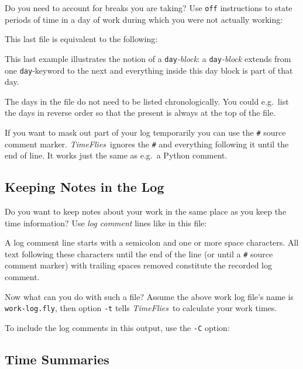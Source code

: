 \documentclass[11pt]{article}
\newcommand{\timeflies}{\emph{TimeFlies}}
\begin{document}
Do you need to account for breaks you are taking? Use \verb-off- instructions to state periods of time in a day of work during which you were not actually working:



This last file is equivalent to the following:



This last example illustrates the notion of a \verb-day-\emph{-block}: a \verb-day-\emph{-block} extends
from one \verb-day--keyword to the next and everything inside this day block is part of that day.

The days in the file do not need to be listed chronologically. You could e.g.\ list the days in reverse order so that the present is always at the top of the file.

If you want to mask out part of your log temporarily you can use the \verb-#- source comment marker. \timeflies\ ignores the \verb-#- and everything following it until the end of line. It works just the same as e.g.\ a Python comment.



\subsection{Keeping Notes in the Log}

Do you want to keep notes about your work in the same place as you keep the time information? Use \emph{log comment} lines like in this file:



A log comment line starts with a semicolon and one or more space characters. All text following these characters until the end of the line (or until a \verb-#- source comment marker) with trailing spaces removed constitute the recorded log comment.

Now what can you do with such a file? Assume the above work log file's name is \verb:work-log.fly:, then option \verb:-t: tells \timeflies\ to calculate your work times.



To include the log comments in this output, use the \verb=-C= option:



\subsection{Time Summaries}
\end{document}
